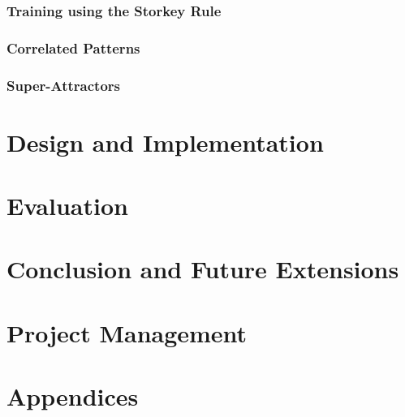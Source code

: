 \documentclass[11pt,a4paper,oneside]{report}
\begin{document}
\subsection{Training using the Storkey Rule}

\subsection{Correlated Patterns}

\subsection{Super-Attractors}


\chapter{Design and Implementation}



\chapter{Evaluation}




\chapter{Conclusion and Future Extensions}

\chapter{Project Management}




\nocite{*} %





\chapter{Appendices}
\end{document}

